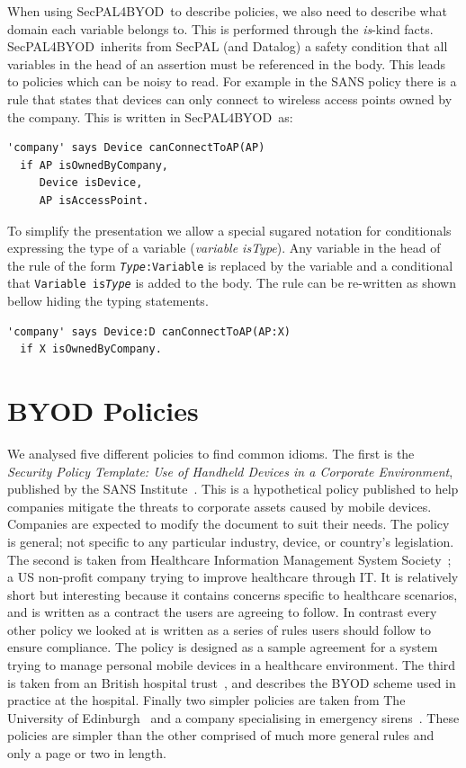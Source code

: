 \documentclass{llncs}
\newcommand{\AppPAL}[0]{SecPAL4BYOD}
\begin{document}
When using \AppPAL~to describe policies, we also need to describe what domain each variable belongs to.
This is performed through the \emph{is}-kind facts.
\AppPAL~inherits from SecPAL (and Datalog) a safety condition that all variables in the head of an assertion must be referenced in the body.
This leads to policies which can be noisy to read.
For example in the SANS policy there is a rule that states that devices can only connect to wireless access points owned by the company.
This is written in \AppPAL~as:
\begin{lstlisting}
'company' says Device canConnectToAP(AP)
  if AP isOwnedByCompany,
     Device isDevice,
     AP isAccessPoint.
\end{lstlisting}
To simplify the presentation we allow a special sugared notation for conditionals expressing the type of a variable (\emph{variable \emph{is}Type}).
Any variable in the head of the rule of the form \texttt{\emph{Type}:Variable} is replaced by the variable and a conditional that \texttt{Variable is\emph{Type}} is added to the body.
The rule can be re-written as shown bellow hiding the typing statements.
\begin{lstlisting}
'company' says Device:D canConnectToAP(AP:X)
  if X isOwnedByCompany.
\end{lstlisting}

\section{BYOD Policies}
\label{ssec:byod-policies}

We analysed five different policies to find common idioms.
The first is the \emph{Security Policy Template: Use of Handheld Devices in a Corporate Environment}, published by the SANS Institute~\cite{nicholas_r._c._guerin_security_2008}.
This is a hypothetical policy published to help companies mitigate the threats to corporate assets caused by mobile devices.
Companies are expected to modify the document to suit their needs.
The policy is general; not specific to any particular industry, device, or country's legislation.
The second is taken from Healthcare Information Management System Society~\cite{healthcare_information_and_management_systems_society_mobile_2012};
  a US non-profit company trying to improve healthcare through IT.
It is relatively short but interesting because it contains concerns specific to healthcare scenarios, and is written as a contract the users are agreeing to follow.
In contrast every other policy we looked at is written as a series of rules users should follow to ensure compliance.
The policy is designed as a sample agreement for a system trying to manage personal mobile devices in a healthcare environment.
The third is taken from an British hospital trust~\cite{kennington_mobiles_2014}, and describes the BYOD scheme used in practice at the hospital.
Finally two simpler policies are taken from The University of Edinburgh~\cite{david_williamson_bring_2015} and a company specialising in emergency sirens~\cite{code3pse.org_sample_????}.
These policies are simpler than the other comprised of much more general rules and only a page or two in length.
\end{document}
